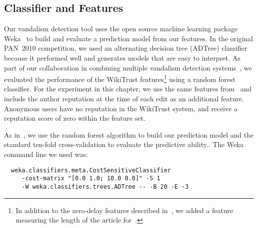 \newcommand{\sign}{{{\textrm{sign}}}}

\subsection{Classifier and Features}

Our vandalism detection tool uses the open source machine learning
package Weka~\cite{Weka09} to build and evaluate a prediction model from
our features.
In the original PAN~2010 competition, we used an alternating decision
tree (ADTree) classifier~\cite{Adler2010b} because it performed well and
generates models that are easy to interpret.
As part of our collaboration in combining multiple vandalism detection
systems~\cite{Adler2011a}, we evaluated the performance of the
WikiTrust features\footnote{In addition to the zero-delay features
described in~\cite{Adler2010b}, we added a feature measuring the length
of the article for~\cite{Adler2011a}.}
using a random forest classifier.
For the experiment in this chapter, we use the same features
from~\cite{Adler2010b} and include the author reputation at the time of
each edit as an additional feature.
Anonymous users have no reputation in the WikiTrust system, and receive
a reputation score of zero within the feature set.

As in~\cite{Adler2011a}, we use the random forest algorithm to build our
prediction model and the standard ten-fold cross-validation to evaluate
the predictive ability..
The Weka command line we used was:
%
{\small
\begin{verbatim}
  weka.classifiers.meta.CostSensitiveClassifier
     -cost-matrix "[0.0 1.0; 10.0 0.0]" -S 1
     -W weka.classifiers.trees.ADTree -- -B 20 -E -3
\end{verbatim}
}

